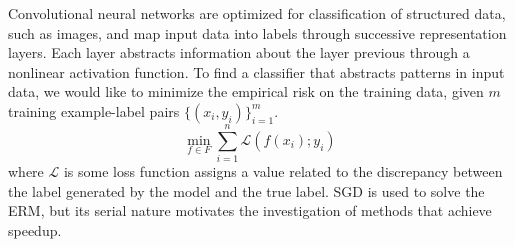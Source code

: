 Convolutional neural networks are optimized for classification of structured data, such as images, and map input data into labels through successive representation layers.  Each layer abstracts information about the layer previous through a nonlinear activation function.  
To find a classifier that abstracts patterns in input data, we would like to minimize the empirical risk on the training data, given $m$ training example-label pairs $\{(x_i,y_i)\}_{i=1}^m$.
\begin{equation}
	\min_{f\in F}\sum_{i=1}^n \mathcal{L}(f(x_i);y_i)
	\label{eq:erm}
\end{equation}
where $\mathcal{L}$ is some loss function assigns a value related to the discrepancy between the label generated by the model and the true label.  SGD is used to solve the ERM, but its serial nature motivates the investigation of methods that achieve speedup.